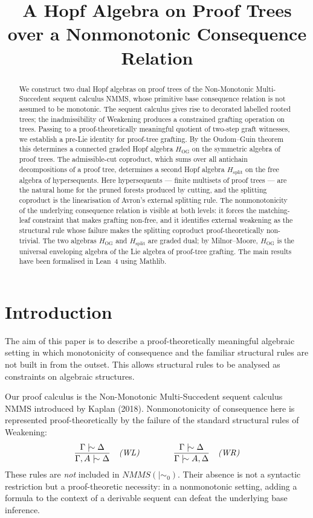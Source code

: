 \documentclass[11pt]{article}
\title{A Hopf Algebra on Proof Trees over a Nonmonotonic Consequence Relation}
\author{}
\date{}
\newcommand{\ms}{\mathrel{\mid\!\sim}}
\newcommand{\mszero}{\mathrel{\mid\!\sim_{0}}}
\newcommand{\NMMS}{\mathit{NMMS}}
\begin{document}
\maketitle

\begin{abstract}
We construct two dual Hopf algebras on proof trees of the Non-Monotonic Multi-Succedent sequent calculus NMMS, whose primitive base consequence relation is not assumed to be monotonic. The sequent calculus gives rise to decorated labelled rooted trees; the inadmissibility of Weakening produces a constrained grafting operation on trees. Passing to a proof-theoretically meaningful quotient of two-step graft witnesses, we establish a pre-Lie identity for proof-tree grafting. By the Oudom--Guin theorem this determines a connected graded Hopf algebra $H_{\mathrm{OG}}$ on the symmetric algebra of proof trees. The admissible-cut coproduct, which sums over all antichain decompositions of a proof tree, determines a second Hopf algebra $H_{\mathrm{split}}$ on the free algebra of hypersequents. Here hypersequents --- finite multisets of proof trees --- are the natural home for the pruned forests produced by cutting, and the splitting coproduct is the linearisation of Avron's external splitting rule. The nonmonotonicity of the underlying consequence relation is visible at both levels: it forces the matching-leaf constraint that makes grafting non-free, and it identifies external weakening as the structural rule whose failure makes the splitting coproduct proof-theoretically non-trivial. The two algebras $H_{\mathrm{OG}}$ and $H_{\mathrm{split}}$ are graded dual; by Milnor--Moore, $H_{\mathrm{OG}}$ is the universal enveloping algebra of the Lie algebra of proof-tree grafting. The main results have been formalised in Lean~4 using Mathlib.
\end{abstract}

\section{Introduction}

The aim of this paper is to describe a proof-theoretically meaningful algebraic setting in which monotonicity of consequence and the familiar structural rules are not built in
from the outset. This allows structural rules to be analysed as constraints on algebraic structures.

\vspace{0.2cm}

Our proof calculus is the Non-Monotonic Multi-Succedent sequent calculus NMMS introduced by Kaplan (2018). Nonmonotonicity of consequence here is represented proof-theoretically by the failure of the standard structural rules of Weakening:
\[
\frac{\Gamma \ms \Delta}{\Gamma,A \ms \Delta}
\quad\text{\emph{(WL)}}
\qquad\qquad
\frac{\Gamma \ms \Delta}{\Gamma \ms A,\Delta}
\quad\text{\emph{(WR)}}
\]
These rules are \emph{not} included in $\NMMS(\mszero)$. Their absence is not a syntactic restriction but a proof-theoretic necessity: in a nonmonotonic setting, adding a formula to the context of a derivable sequent can defeat the underlying base inference.
\end{document}
